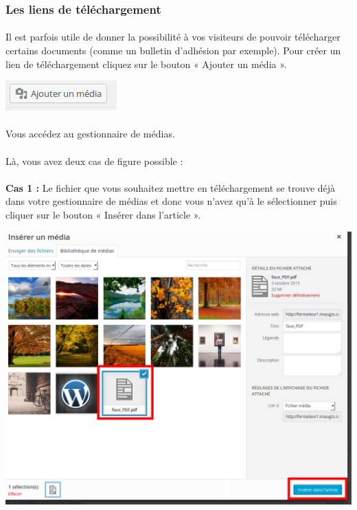 \documentclass[10pt,a4paper]{article}
\begin{document}
\subsubsection{Les liens de téléchargement}
\paragraph{}Il est parfois utile de donner la possibilité à vos visiteurs de pouvoir télécharger certains documents (comme un bulletin d'adhésion par exemple). Pour créer un lien de téléchargement cliquez sur le bouton « Ajouter un média ».
\begin{center}
\includegraphics[scale=0.35]{img/0081.png}
\end{center}
\paragraph{}Vous accédez au gestionnaire de médias.
\paragraph{}Là, vous avez deux cas de figure possible :
\paragraph{}\textbf{Cas 1 : }Le fichier que vous souhaitez mettre en téléchargement se trouve déjà dans votre gestionnaire de médias et donc vous n'avez qu'à le sélectionner puis cliquer sur le bouton « Insérer dans l'article ».
\begin{center}
\includegraphics[scale=0.3]{img/0082.png}
\end{center}
\end{document}
